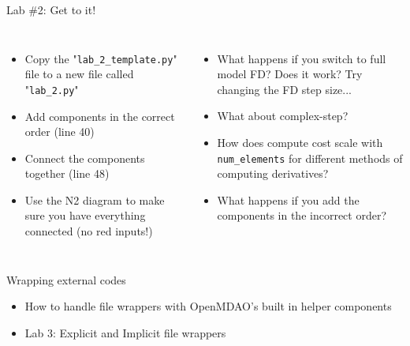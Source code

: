 \documentclass[aspectratio=169, usenames,dvipsnames, 14pt]{beamer}
\begin{document}
\begin{frame}{Lab \#2: Get to it!}
	\begin{columns}
			\begin{itemize}
				\item \small Copy the "\texttt{lab\_2\_template.py}" file to a new file called "\texttt{lab\_2.py}"
				\item \small Add components in the correct order (line 40)
				\item \small Connect the components together (line 48)
				\item \small Use the N2 diagram to make sure you have everything connected (no red inputs!)
			\end{itemize}
			\begin{itemize}
				\item \small What happens if you switch to full model FD? Does it work? Try changing the FD step size...
				\item \small What about complex-step?
				\item \small How does compute cost scale with \texttt{num\_elements} for different methods of computing derivatives?
				\item \small What happens if you add the components in the incorrect order?
			\end{itemize}
	\end{columns}
\end{frame}

\begingroup
{}
\begin{frame}{Wrapping external codes}
	\begin{itemize}
		\item How to handle file wrappers with OpenMDAO's built in helper components
		\item Lab 3: Explicit and Implicit file wrappers
	\end{itemize}
\end{frame}
\endgroup
\end{document}
